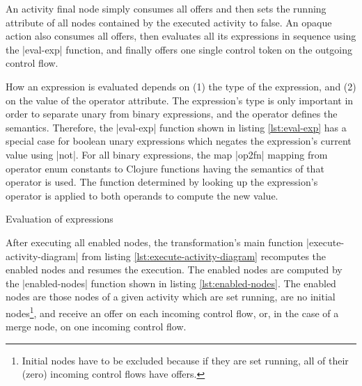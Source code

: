\documentclass[submission]{eptcs}
\newcommand{\code}{\clojureinline}
\begin{document}
An activity final node simply consumes all offers and then sets the
\textsf{running} attribute of all nodes contained by the executed activity to
false.  An opaque action also consumes all offers, then evaluates all its
expressions in sequence using the \code|eval-exp| function, and finally offers
one single control token on the outgoing control flow.

How an expression is evaluated depends on (1) the type of the expression, and
(2) on the value of the \textsf{operator} attribute.  The expression's type is
only important in order to separate unary from binary expressions, and the
operator defines the semantics.  Therefore, the \code|eval-exp| function shown
in listing \vref{lst:eval-exp} has a special case for boolean unary expressions
which negates the expression's current value using \code|not|.  For all binary
expressions, the map \code|op2fn| mapping from operator enum constants to
Clojure functions having the semantics of that operator is used.  The function
determined by looking up the expression's operator is applied to both operands
to compute the new value.

\begin{listing}[h!tb]
\caption{Evaluation of expressions}
\label{lst:eval-exp}
\end{listing}

After executing all enabled nodes, the transformation's main function
\code|execute-activity-diagram| from listing
\vref{lst:execute-activity-diagram} recomputes the enabled nodes and resumes
the execution.  The enabled nodes are computed by the \code|enabled-nodes|
function shown in listing \vref{lst:enabled-nodes}.  The enabled nodes are
those nodes of a given activity which are set running, are no initial
nodes\footnote{Initial nodes have to be excluded because if they are set
  running, all of their (zero) incoming control flows have offers.}, and
receive an offer on each incoming control flow, or, in the case of a merge
node, on one incoming control flow.
\end{document}
